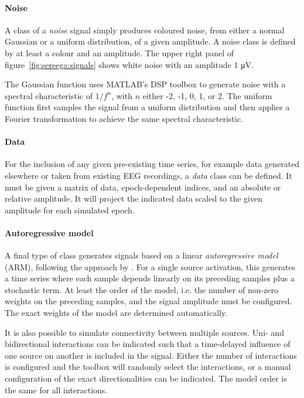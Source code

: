 \paragraph{Noise} A class of a \emph{noise} signal simply produces coloured noise, from either a normal Gaussian or a uniform distribution, of a given amplitude. A noise class is defined by at least a colour and an amplitude. The upper right panel of figure~\ref{fig:sereega:signals} shows white noise with an amplitude 1 \si{\micro\volt}.

The Gaussian function uses MATLAB's DSP toolbox to generate noise with a spectral characteristic of $1/f^n$, with $n$ either -2, -1, 0, 1, or 2. The uniform function first samples the signal from a uniform distribution and then applies a Fourier transformation to achieve the same spectral characteristic.

\paragraph{Data} For the inclusion of any given pre-existing time series, for example data generated elsewhere or taken from existing EEG recordings, a \emph{data} class can be defined. It must be given a matrix of data, epoch-dependent indices, and an absolute or relative amplitude. It will project the indicated data scaled to the given amplitude for each simulated epoch. 

\paragraph{Autoregressive model} A final type of class generates signals based on a linear \emph{autoregressive model} (ARM), following the approach by . For a single source activation, this generates a time series where each sample depends linearly on its preceding samples plus a stochastic term. At least the order of the model, i.e. the number of non-zero weights on the preceding samples, and the signal amplitude must be configured. The exact weights of the model are determined automatically.

It is also possible to simulate connectivity between multiple sources. Uni- and bidirectional interactions can be indicated such that a time-delayed influence of one source on another is included in the signal. Either the number of interactions is configured and the toolbox will randomly select the interactions, or a manual configuration of the exact directionalities can be indicated. The model order is the same for all interactions.

